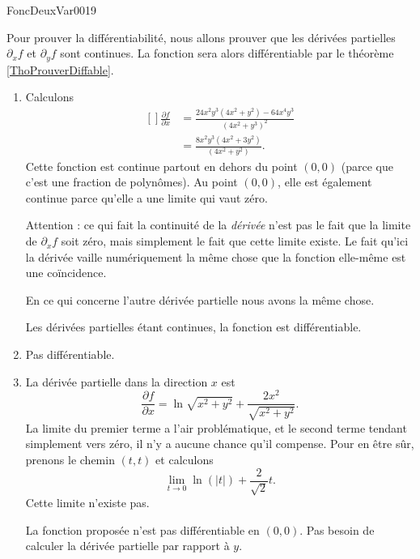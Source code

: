 
\begin{corrige}{FoncDeuxVar0019}

	Pour prouver la différentiabilité, nous allons prouver que les dérivées partielles $\partial_xf$ et $\partial_yf$ sont continues. La fonction sera alors différentiable par le théorème \ref{ThoProuverDiffable}.

	\begin{enumerate}

		\item
			Calculons
			\begin{equation}
				\begin{aligned}[]
					\frac{ \partial f }{ \partial x }&=\frac{ 24x^2y^3(4x^2+y^2)-64x^4y^3 }{ (4x^2+y^3)^2 }\\
					&=\frac{ 8x^2y^3(4x^2+3y^2) }{ (4x^2+y^2) }.
				\end{aligned}
			\end{equation}
			Cette fonction est continue partout en dehors du point $(0,0)$ (parce que c'est une fraction de polynômes). Au point $(0,0)$, elle est également continue parce qu'elle a une limite qui vaut zéro. 
			
			Attention : ce qui fait la continuité de la \emph{dérivée} n'est pas le fait que la limite de $\partial_xf$ soit zéro, mais simplement le fait que cette limite existe. Le fait qu'ici la dérivée vaille numériquement la même chose que la fonction elle-même est une coïncidence.

			En ce qui concerne l'autre dérivée partielle nous avons la même chose.

			Les dérivées partielles étant continues, la fonction est différentiable.
		\item	Pas différentiable.
		\item
			La dérivée partielle dans la direction $x$ est
			\begin{equation}
				\frac{ \partial f }{ \partial x }=\ln\sqrt{x^2+y^2}+\frac{ 2x^2 }{ \sqrt{x^2+y^2} }.
			\end{equation}
			La limite du premier terme a l'air problématique, et le second terme tendant simplement vers zéro, il n'y a aucune chance qu'il compense. Pour en être sûr, prenons le chemin $(t,t)$ et calculons
			\begin{equation}
				\lim_{t\to 0}\ln(| t |)+\frac{ 2 }{ \sqrt{2} }t.
			\end{equation}
			Cette limite n'existe pas.

			La fonction proposée n'est pas différentiable en $(0,0)$. Pas besoin de calculer la dérivée partielle par rapport à $y$.

	\end{enumerate}
\end{corrige}

